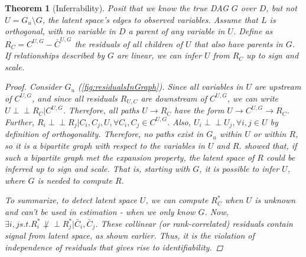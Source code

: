 \documentclass[letterpaper]{article}
\newtheorem{theorem}{Theorem}
\begin{document}
\begin{theorem}[Inferrability]
\label{thm:inferrability}
Posit that we know the true DAG $G$ over $D$, but not $U = G_u \setminus G$, the latent space's edges to observed variables.  Assume that $L$ is orthogonal, with no variable in $D$ a parent of any variable in $U$. Define as $R_C = C^{U,G} - \bar{C}^{U,G}$ the residuals of all children of $U$ that also have parents in $G$.  If relationships described by $G$ are linear, we can infer $U$ from $R_C$ up to sign and scale.  

\begin{proof}
Consider $G_u$ (\ref{fig:residualsInGraph}).  Since all variables in $U$ are upstream of $C^{U,G}$, and since all residuals $R_{U,C}$ are downstream of $C^{U,G}$, we can write $U \perp\!\!\!\perp R_C | C^{U,G}$.  Therefore, all paths $U \rightarrow R_C$ have the form $U \rightarrow C^{U,G} \rightarrow R_C$.  Further, $R_i \perp\!\!\!\perp R_j | C_i,C_j,U,   \forall C_i, C_j \in C^{U,G}$. Also, $U_i \perp\!\!\!\perp U_j, \forall i, j \in U$ by definition of orthogonality.  Therefore, no paths exist in $G_u$ within $U$ or within $R$, so it is a bipartite graph with respect to the variables in $U$ and $R$.  \cite{anandkumar_learning_2013} showed that, if such a bipartite graph met the expansion property, the latent space of $R$ could be inferred up to sign and scale.  That is, starting with $G$, it is possible to infer $U$, where $G$ is needed to compute $R$.  

To summarize, to detect latent space $U$, we can compute $R^*_C$ when $U$ is unknown and can't be used in estimation - when we only know $G$.   Now, $\exists i, j s.t. R^*_i \not\perp\!\!\!\perp R^*_j | \bar{C}_i, \bar{C}_j$. These collinear (or rank-correlated) residuals contain signal from latent space, as shown earlier.  Thus, it is the violation of independence of residuals  that gives rise to identifiability. 
\end{proof}
\end{theorem}
\end{document}
